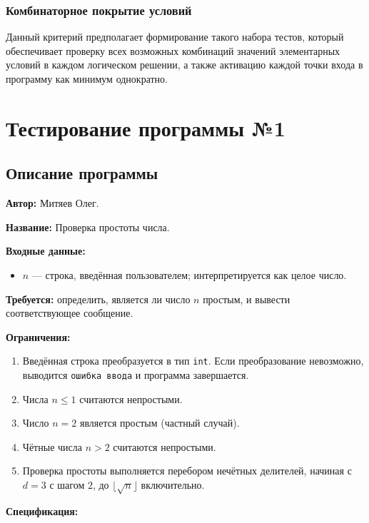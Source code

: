 \documentclass{article}[14pt]
\begin{document}
\subsubsection{Комбинаторное покрытие условий}

Данный критерий предполагает формирование такого набора тестов, который обеспечивает проверку всех возможных комбинаций 
значений элементарных условий в каждом логическом решении, а также активацию каждой точки входа в программу как минимум 
однократно.

\pagebreak

\section{Тестирование программы №1}

\subsection{Описание программы}

\noindent \textbf{Автор:} Митяев Олег.

\noindent \textbf{Название:} Проверка простоты числа.

\noindent \textbf{Входные данные:}
\begin{itemize}
    \item $n$ --- строка, введённая пользователем; интерпретируется как целое число.
\end{itemize}

\noindent \textbf{Требуется:} определить, является ли число $n$ простым, и вывести соответствующее сообщение.

\noindent \textbf{Ограничения:}
\begin{enumerate}
    \item Введённая строка преобразуется в тип \texttt{int}. Если преобразование невозможно, выводится \texttt{ошибка ввода} и программа завершается.
    \item Числа $n \leq 1$ считаются непростыми.
    \item Число $n = 2$ является простым (частный случай).
    \item Чётные числа $n > 2$ считаются непростыми.
    \item Проверка простоты выполняется перебором нечётных делителей, начиная с $d = 3$ с шагом $2$, до $\lfloor\sqrt{n}\rfloor$ включительно.
\end{enumerate}

\noindent \textbf{Спецификация:}
\end{document}
